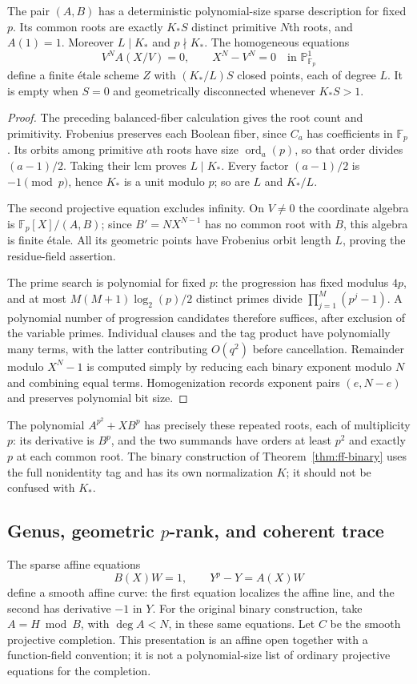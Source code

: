 \begin{theorem}\label{thm:ff-unit}
The pair $(A,B)$ has a deterministic polynomial-size sparse description for fixed $p$. Its common roots are exactly $K_*S$ distinct primitive $N$th roots, and $A(1)=1$. Moreover $L\mid K_*$ and $p\nmid K_*$. The homogeneous equations
\[
 V^NA(X/V)=0,\qquad X^N-V^N=0
 \quad\text{in }\mathbb P^1_{\mathbb F_p}
\]
define a finite \'etale scheme $Z$ with $(K_*/L)S$ closed points, each of degree $L$. It is empty when $S=0$ and geometrically disconnected whenever $K_*S>1$.
\end{theorem}
\begin{proof}
The preceding balanced-fiber calculation gives the root count and primitivity. Frobenius preserves each Boolean fiber, since $C_a$ has coefficients in $\mathbb F_p$. Its orbits among primitive $a$th roots have size $\operatorname{ord}_a(p)$, so that order divides $(a-1)/2$. Taking their lcm proves $L\mid K_*$. Every factor $(a-1)/2$ is $-1\pmod p$, hence $K_*$ is a unit modulo $p$; so are $L$ and $K_*/L$.

The second projective equation excludes infinity. On $V\neq0$ the coordinate algebra is $\mathbb F_p[X]/(A,B)$; since $B'=NX^{N-1}$ has no common root with $B$, this algebra is finite \'etale. All its geometric points have Frobenius orbit length $L$, proving the residue-field assertion.

The prime search is polynomial for fixed $p$: the progression has fixed modulus $4p$, and at most $M(M+1)\log_2(p)/2$ distinct primes divide $\prod_{j=1}^M(p^j-1)$. A polynomial number of progression candidates therefore suffices, after exclusion of the variable primes. Individual clauses and the tag product have polynomially many terms, with the latter contributing $O(q^2)$ before cancellation. Remainder modulo $X^N-1$ is computed simply by reducing each binary exponent modulo $N$ and combining equal terms. Homogenization records exponent pairs $(e,N-e)$ and preserves polynomial bit size.
\end{proof}

The polynomial $A^{p^2}+XB^p$ has precisely these repeated roots, each of multiplicity $p$: its derivative is $B^p$, and the two summands have orders at least $p^2$ and exactly $p$ at each common root. The binary construction of Theorem~\ref{thm:ff-binary} uses the full nonidentity tag and has its own normalization $K$; it should not be confused with $K_*$.

\subsection{Genus, geometric $p$-rank, and coherent trace}
The sparse affine equations
\begin{equation}\label{eq:ff-AS}
 B(X)W=1,\qquad Y^p-Y=A(X)W
\end{equation}
define a smooth affine curve: the first equation localizes the affine line, and the second has derivative $-1$ in $Y$. For the original binary construction, take $A=H\bmod B$, with $\deg A<N$, in these same equations. Let $C$ be the smooth projective completion. This presentation is an affine open together with a function-field convention; it is not a polynomial-size list of ordinary projective equations for the completion.

